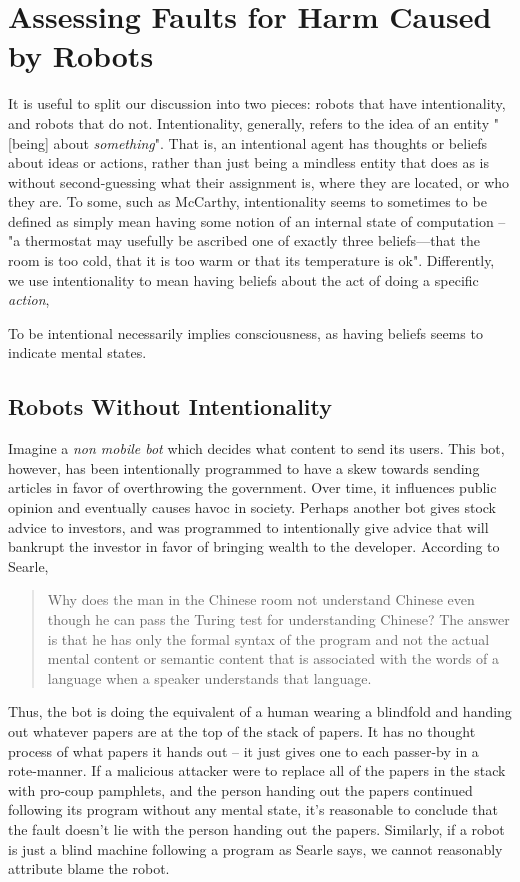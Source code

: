 \documentclass[12]{article}
\begin{document}
\section{Assessing Faults for Harm Caused by Robots}
	It is useful to split our discussion into two pieces: robots that have intentionality, and robots that do not. Intentionality, generally, refers to the idea of an entity "[being] about \textit{something}"\cite{intentionality}. That is, an intentional agent has thoughts or beliefs about ideas or actions, rather than just being a mindless entity that does as is without second-guessing what their assignment is, where they are located, or who they are. To some, such as McCarthy, intentionality seems to sometimes to be defined as simply mean having some notion of an internal state of computation -- "a thermostat may usefully be ascribed one of exactly three beliefs—that the room is too cold, that it is too warm or that its temperature is ok"\cite{mccarthy}. Differently, we use intentionality to mean having beliefs about the act of doing a specific \textit{action}, 
	
	 To be intentional necessarily implies consciousness, as having beliefs seems to indicate mental states.

	\subsection{Robots Without Intentionality}
		Imagine a \textit{non mobile bot} which decides what content to send its users. This bot, however, has been intentionally programmed to have a skew towards sending articles in favor of overthrowing the government. Over time, it influences public opinion and eventually causes havoc in society. Perhaps another bot gives stock advice to investors, and was programmed to intentionally give advice that will bankrupt the investor in favor of bringing wealth to the developer. According to Searle\cite{chineseroom1, chineseroom2},
	
		\begin{quote}
			Why does the man in the Chinese room not understand Chinese even though he can pass the Turing test for understanding Chinese? The answer is that he has only the formal syntax of the program and not the actual mental content or semantic content that is associated with the words of a language when a speaker understands that language.
		\end{quote}
	
		Thus, the bot is doing the equivalent of a human wearing a blindfold and handing out whatever papers are at the top of the stack of papers. It has no thought process of what papers it hands out -- it just gives one to each passer-by in a rote-manner. If a malicious attacker were to replace all of the papers in the stack with pro-coup pamphlets, and the person handing out the papers continued following its program without any mental state, it's reasonable to conclude that the fault doesn't lie with the person handing out the papers. Similarly, if a robot is just a blind machine following a program as Searle says, we cannot reasonably attribute blame the robot. 
	
\end{document}

